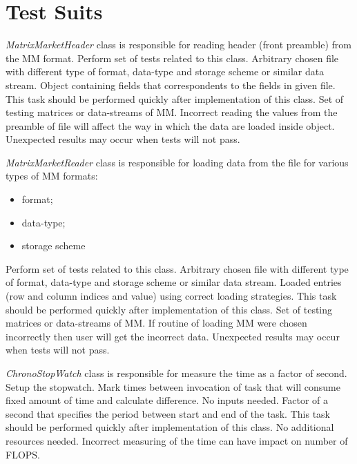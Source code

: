 \chapter{Test Suits} \label{chp:test-suits}
	{
		{
			\emph{MatrixMarketHeader} class is responsible for reading header (front preamble) from the \gls{MM} format.
		}
		{
			Perform set of tests related to this class. 
		}
		{
			Arbitrary chosen file with different type of format, data-type and storage scheme or similar data stream.
		}
		{
			Object containing fields that correspondents to the fields in given file. 
		}
		{
			This task should be performed quickly after implementation of this class.
		}
		{
			Set of testing matrices or data-streams of \gls{MM}.
		}
		{
			Incorrect reading the values from the preamble of file will affect the way in which the data are loaded inside object. Unexpected results may occur when tests will not pass. 
		}
	}
	{
		{
			\emph{MatrixMarketReader} class is responsible for loading data from the file for various types of \gls{MM} formats:
			\begin{itemize}
				\item format;
				\item data-type;
				\item storage scheme
			\end{itemize}
		}
		{
			Perform set of tests related to this class. 
		}
		{
			Arbitrary chosen file with different type of format, data-type and storage scheme or similar data stream. 
		}
		{
			Loaded entries (row and column indices and value) using correct loading strategies. 
		}
		{
			This task should be performed quickly after implementation of this class.
		}
		{
			Set of testing matrices or data-streams of \gls{MM}.
		}
		{
			If routine of loading \gls{MM} were chosen incorrectly then user will get the incorrect data.
			Unexpected results may occur when tests will not pass. 
		}
	}
	\clearpage
	{
		{
			\emph{ChronoStopWatch} class is responsible for measure the time as a factor of second.
		}
		{
			Setup the stopwatch. Mark times between invocation of task that will consume fixed amount of time and calculate difference.
		}
		{
			No inputs needed.
		}
		{
			Factor of a second that specifies the period between start and end of the task.
		}
		{
			This task should be performed quickly after implementation of this class.
		}
		{
			No additional resources needed.
		}
		{
			Incorrect measuring of the time can have impact on number of \gls{FLOPS}.
		}
	}

